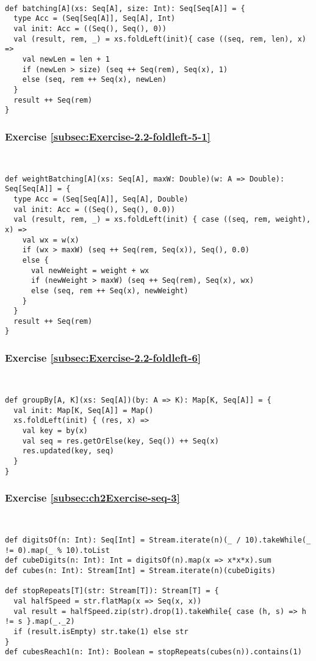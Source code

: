 ~
\begin{lstlisting}
def batching[A](xs: Seq[A], size: Int): Seq[Seq[A]] = {  
  type Acc = (Seq[Seq[A]], Seq[A], Int)
  val init: Acc = ((Seq(), Seq(), 0))
  val (result, rem, _) = xs.foldLeft(init){ case ((seq, rem, len), x) =>
    val newLen = len + 1
    if (newLen > size) (seq ++ Seq(rem), Seq(x), 1)
    else (seq, rem ++ Seq(x), newLen)
  }
  result ++ Seq(rem)
}
\end{lstlisting}


\subsubsection*{Exercise \ref{subsec:Exercise-2.2-foldleft-5-1}}

~
\begin{lstlisting}
def weightBatching[A](xs: Seq[A], maxW: Double)(w: A => Double): Seq[Seq[A]] = {  
  type Acc = (Seq[Seq[A]], Seq[A], Double)
  val init: Acc = ((Seq(), Seq(), 0.0))
  val (result, rem, _) = xs.foldLeft(init) { case ((seq, rem, weight), x) =>
    val wx = w(x)
    if (wx > maxW) (seq ++ Seq(rem, Seq(x)), Seq(), 0.0)
    else {
      val newWeight = weight + wx
      if (newWeight > maxW) (seq ++ Seq(rem), Seq(x), wx)
      else (seq, rem ++ Seq(x), newWeight)
    }
  }
  result ++ Seq(rem)
}
\end{lstlisting}


\subsubsection*{Exercise \ref{subsec:Exercise-2.2-foldleft-6}}

~
\begin{lstlisting}
def groupBy[A, K](xs: Seq[A])(by: A => K): Map[K, Seq[A]] = {  
  val init: Map[K, Seq[A]] = Map()
  xs.foldLeft(init) { (res, x) =>
    val key = by(x)
    val seq = res.getOrElse(key, Seq()) ++ Seq(x)
    res.updated(key, seq)
  }
}
\end{lstlisting}


\subsubsection*{Exercise \ref{subsec:ch2Exercise-seq-3}}

~
\begin{lstlisting}
def digitsOf(n: Int): Seq[Int] = Stream.iterate(n)(_ / 10).takeWhile(_ != 0).map(_ % 10).toList
def cubeDigits(n: Int): Int = digitsOf(n).map(x => x*x*x).sum
def cubes(n: Int): Stream[Int] = Stream.iterate(n)(cubeDigits)

def stopRepeats[T](str: Stream[T]): Stream[T] = {
  val halfSpeed = str.flatMap(x => Seq(x, x))
  val result = halfSpeed.zip(str).drop(1).takeWhile{ case (h, s) => h != s }.map(_._2)
  if (result.isEmpty) str.take(1) else str
}
def cubesReach1(n: Int): Boolean = stopRepeats(cubes(n)).contains(1)
\end{lstlisting}


